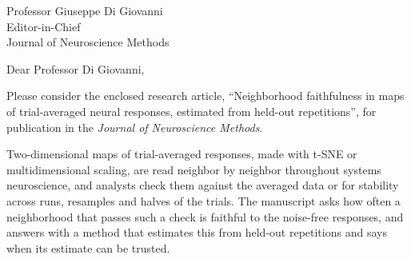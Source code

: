 \documentclass[11pt]{letter}
\newcommand{\MsTitle}{Neighborhood faithfulness in maps of trial-averaged neural responses, estimated from held-out repetitions}
\begin{document}
\begin{letter}{Professor Giuseppe Di Giovanni\\ Editor-in-Chief\\ Journal of Neuroscience Methods}
\opening{Dear Professor Di Giovanni,}

Please consider the enclosed research article, ``\MsTitle'', for publication in the
\emph{Journal of Neuroscience Methods}.

Two-dimensional maps of trial-averaged responses, made with t-SNE or multidimensional scaling, are
read neighbor by neighbor throughout systems neuroscience, and analysts check them against the
averaged data or for stability across runs, resamples and halves of the trials. The manuscript
asks how often a neighborhood that passes such a check is faithful to the noise-free responses,
and answers with a method that estimates this from held-out repetitions and says when its estimate
can be trusted.


\end{letter}
\end{document}
